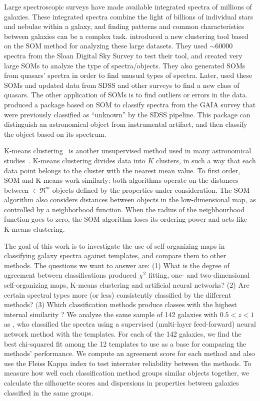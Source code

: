 Large spectroscopic surveys have made available integrated spectra of millions of galaxies.
These integrated spectra combine the light of billions of individual stars and nebulae within a galaxy, and
finding patterns and common characteristics between galaxies can be a complex task.
\citet{In12} introduced a new clustering tool based on the SOM method for analyzing these large datasets.
They used $\sim 60000$ spectra from the Sloan Digital Sky Survey \citep[SDSS;][]{Abazajian09} to test their tool, and created very large SOMs to analyze the type of spectra/objects.
They also generated SOMs from quasars' spectra in order to find unusual types of spectra. 
Later, \citet{Meusinger16} used these SOMs and updated data from SDSS and other surveys to find a new class of quasars.
The other application of SOMs is to find outliers or errors in the data.
\citet{Fustes13} produced a package based on SOM to classify spectra from the GAIA survey that were previously classified as ``unknown'' by the SDSS pipeline. This package can distinguish an astronomical object from instrumental artifact, and then classify the object based on its spectrum.


K-means clustering~\citep{Macqueen67} is another unsupervised method used in many astronomical studies~\citep[e.g.][]{DAbrusco12,Ordov14,Boersma14,Aycha16}.
K-means clustering divides data into $K$ clusters, in such a way that each data point belongs to the cluster with the nearest mean value.
To first order, SOM and K-means work similarly: both algorithms operate on the distances between  $\in \Re^m$ objects defined by the properties under consideration.
The SOM algorithm also considers distances between objects in the low-dimensional map, as controlled by a neighborhood function. 
When the radius of the neighbourhood function goes to zero, the SOM algorithm loses its ordering power and acts like K-means clustering.




The goal of this work is to investigate the use of self-organizing maps in classifying galaxy spectra against templates, and compare them to other methods. 
The questions we want to answer are: 
(1) What is the degree of agreement between classifications produced $\chi^2$ fitting, one- and two-dimensional self-organizing maps, K-means clustering and artificial neural networks? 
(2) Are certain spectral types more (or less) consistently classified by the different methods? 
(3) Which classification methods produce classes with the highest internal similarity ?
We analyze the same sample of 142 galaxies with $0.5 < z < 1$ as 
\citet[][hereafter ]{Hossein12}, who classified the spectra using a supervised (multi-layer feed-forward) neural network method with the  templates.
For each of the 142 galaxies, we find the best chi-squared fit among the 12 templates to use as a base for comparing the methods' performance.
We compute an agreement score for each method and also use the Fleiss Kappa index \citet{Fleiss71} to test interrater reliability 
between the methods.
To measure how well each classification method groups similar objects together, we
calculate the silhouette scores and dispersions in properties between galaxies classified in the same groups.


